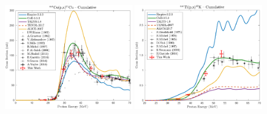 \begin{figure}
 \includegraphics[width=0.49\textwidth]{./figures/61Cu.pdf}
 \includegraphics[width=0.49\textwidth]{./figures/43K.pdf}


\vspace{-20pt} 
\end{figure}


